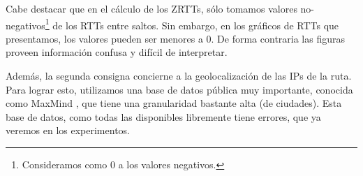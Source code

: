 \par Cabe destacar que en el cálculo de los ZRTTs, sólo tomamos valores no-negativos\footnote{Consideramos como 0 a los valores negativos.} de los RTTs entre saltos. 
Sin embargo, en los gráficos de RTTs que presentamos, los valores pueden ser menores a 0.
De forma contraria las figuras proveen información confusa y difícil de interpretar.

Además, la segunda consigna concierne a la geolocalización de las IPs de la ruta. Para lograr esto, utilizamos una base de datos pública muy importante, conocida como MaxMind \cite{MaxMind}, que tiene una granularidad bastante alta (de ciudades). Esta base de datos, como todas las disponibles libremente tiene errores, que ya veremos en los experimentos.
